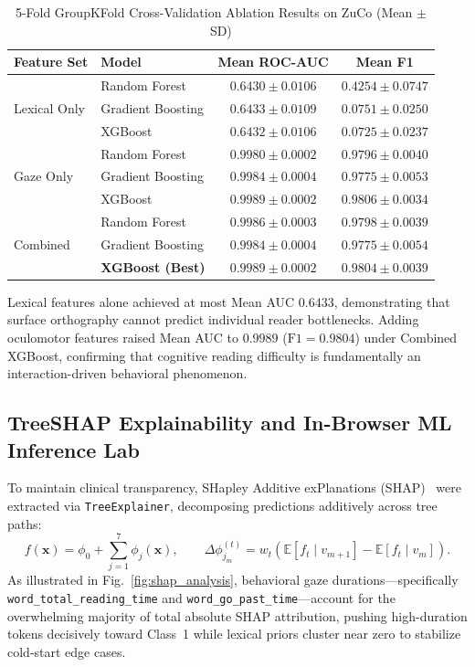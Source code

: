 \documentclass[conference]{IEEEtran}
\begin{document}
\begin{table}[t]
\caption{5-Fold GroupKFold Cross-Validation Ablation Results on ZuCo (Mean $\pm$ SD)}
\centering
\begin{tabular}{|l|l|c|c|}
\hline
\textbf{Feature Set} & \textbf{Model} & \textbf{Mean ROC-AUC} & \textbf{Mean F1} \\
\hline
\multirow{3}{*}{Lexical Only}
 & Random Forest & $0.6430 \pm 0.0106$ & $0.4254 \pm 0.0747$ \\
 & Gradient Boosting & $0.6433 \pm 0.0109$ & $0.0751 \pm 0.0250$ \\
 & XGBoost & $0.6432 \pm 0.0106$ & $0.0725 \pm 0.0237$ \\
\hline
\multirow{3}{*}{Gaze Only}
 & Random Forest & $0.9980 \pm 0.0002$ & $0.9796 \pm 0.0040$ \\
 & Gradient Boosting & $0.9984 \pm 0.0004$ & $0.9775 \pm 0.0053$ \\
 & XGBoost & $0.9989 \pm 0.0002$ & $0.9806 \pm 0.0034$ \\
\hline
\multirow{3}{*}{Combined}
 & Random Forest & $0.9986 \pm 0.0003$ & $0.9798 \pm 0.0039$ \\
 & Gradient Boosting & $0.9984 \pm 0.0004$ & $0.9775 \pm 0.0054$ \\
 & \textbf{XGBoost (Best)} & $\mathbf{0.9989 \pm 0.0002}$ & $\mathbf{0.9804 \pm 0.0039}$ \\
\hline
\end{tabular}
\label{tab:ablation_results}
\end{table}

Lexical features alone achieved at most Mean AUC $0.6433$, demonstrating that surface orthography cannot predict individual reader bottlenecks. Adding oculomotor features raised Mean AUC to $0.9989$ ($\text{F1}=0.9804$) under Combined XGBoost, confirming that cognitive reading difficulty is fundamentally an interaction-driven behavioral phenomenon.

\subsection{TreeSHAP Explainability and In-Browser ML Inference Lab}
To maintain clinical transparency, SHapley Additive exPlanations (SHAP)~\cite{19} were extracted via \texttt{TreeExplainer}, decomposing predictions additively across tree paths:
\begin{equation}
    f(\mathbf{x}) = \phi_0 + \sum_{j=1}^{7} \phi_j(\mathbf{x}), \qquad
    \Delta \phi_{j_m}^{(t)} = w_t\!\left(\mathbb{E}[f_t \mid v_{m+1}] - \mathbb{E}[f_t \mid v_m]\right).
\end{equation}
As illustrated in Fig.~\ref{fig:shap_analysis}, behavioral gaze durations---specifically \texttt{word\_total\_reading\_time} and \texttt{word\_go\_past\_time}---account for the overwhelming majority of total absolute SHAP attribution, pushing high-duration tokens decisively toward Class~1 while lexical priors cluster near zero to stabilize cold-start edge cases.
\end{document}
